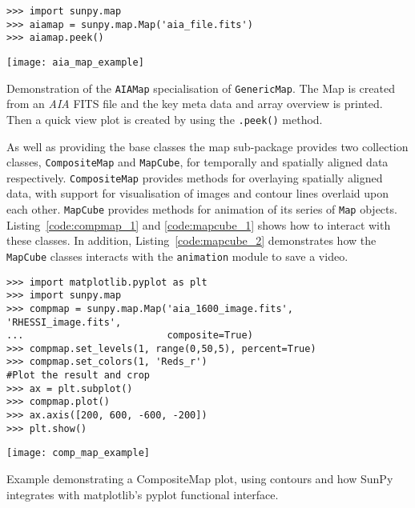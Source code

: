 \begin{listing}[H]
\begin{verbatim}
>>> import sunpy.map
>>> aiamap = sunpy.map.Map('aia_file.fits')
>>> aiamap.peek()
\end{verbatim}
\begin{center}
\texttt{[image: aia\_map\_example]}
\end{center}
\caption{Demonstration of the \texttt{AIAMap} specialisation of 
\texttt{GenericMap}. The Map is created from an \textit{AIA} FITS file and the 
key meta data and array overview is printed. Then a quick view plot is created 
by using the \texttt{.peek()} method.}
\label{code:aia_1}
\end{listing}

As well as providing the base classes the map sub-package provides two 
collection classes, \texttt{CompositeMap} and \texttt{MapCube}, for 
temporally and spatially aligned data respectively.
\texttt{CompositeMap} provides methods for overlaying spatially aligned 
data, with support for visualisation of images and contour lines overlaid 
upon each other.
\texttt{MapCube} 
provides methods for animation of its series of \texttt{Map} objects. 
Listing~\ref{code:compmap_1} and \ref{code:mapcube_1} shows how to interact 
with these classes.
In addition, Listing~\ref{code:mapcube_2} demonstrates how the \texttt{MapCube} 
classes interacts with the \texttt{animation} module to save a video.

\begin{listing}[H]
\begin{verbatim}
>>> import matplotlib.pyplot as plt
>>> import sunpy.map
>>> compmap = sunpy.map.Map('aia_1600_image.fits', 'RHESSI_image.fits', 
...                         composite=True)
>>> compmap.set_levels(1, range(0,50,5), percent=True)
>>> compmap.set_colors(1, 'Reds_r')
#Plot the result and crop
>>> ax = plt.subplot()
>>> compmap.plot()
>>> ax.axis([200, 600, -600, -200])
>>> plt.show()
\end{verbatim}
\begin{center}
\texttt{[image: comp\_map\_example]}
\end{center}
\caption{Example demonstrating a CompositeMap plot, using contours and how 
SunPy integrates with matplotlib's pyplot functional interface.}
\label{code:compmap_1}
\end{listing}

